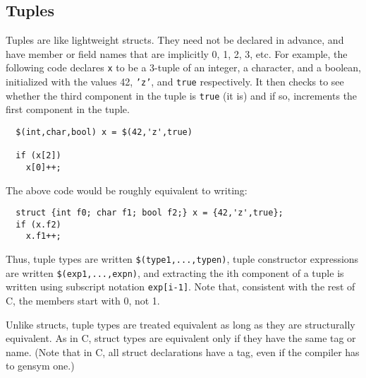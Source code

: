 
\subsection{Tuples}

Tuples are like lightweight structs.  They need not be declared in
advance, and have member or field names that are implicitly 0, 1, 2,
3, etc.  For example, the following code declares \texttt{x} to be a
3-tuple of an integer, a character, and a boolean, initialized with
the values 42, \texttt{'z'}, and \texttt{true} respectively.  It then
checks to see whether the third component in the tuple is \texttt{true}
(it is) and if so, increments the first component in the tuple.
\begin{verbatim}
  $(int,char,bool) x = $(42,'z',true)

  if (x[2])
    x[0]++;
\end{verbatim}

The above code would be roughly equivalent to writing:
\begin{verbatim}
  struct {int f0; char f1; bool f2;} x = {42,'z',true};
  if (x.f2)
    x.f1++;
\end{verbatim}

Thus, tuple types are written \texttt{\$(type1,...,typen)}, tuple
constructor expressions are written \texttt{\$(exp1,...,expn)}, and
extracting the ith component of a tuple is written using subscript
notation \texttt{exp[i-1]}.  Note that, consistent with the rest of C,
the members start with 0, not 1.

Unlike structs, tuple types are treated equivalent as long as they are
structurally equivalent.  As in C, struct types are equivalent only if
they have the same tag or name.  (Note that in C, all struct
declarations have a tag, even if the compiler has to gensym one.)


